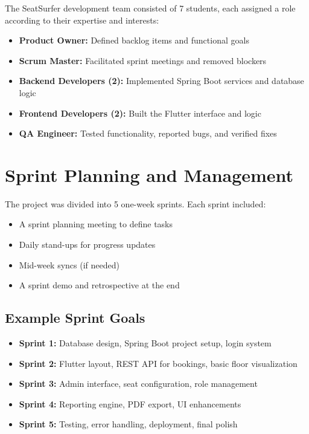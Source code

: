 \documentclass[12pt,a4paper]{report}
\begin{document}
The SeatSurfer development team consisted of 7 students, each assigned a role according to their expertise and interests:

\begin{itemize}
    \item \textbf{Product Owner:} Defined backlog items and functional goals
    \item \textbf{Scrum Master:} Facilitated sprint meetings and removed blockers
    \item \textbf{Backend Developers (2):} Implemented Spring Boot services and database logic
    \item \textbf{Frontend Developers (2):} Built the Flutter interface and logic
    \item \textbf{QA Engineer:} Tested functionality, reported bugs, and verified fixes
\end{itemize}

\section{Sprint Planning and Management}

The project was divided into 5 one-week sprints. Each sprint included:

\begin{itemize}
    \item A sprint planning meeting to define tasks
    \item Daily stand-ups for progress updates
    \item Mid-week syncs (if needed)
    \item A sprint demo and retrospective at the end
\end{itemize}

\subsection*{Example Sprint Goals}

\begin{itemize}
    \item \textbf{Sprint 1:} Database design, Spring Boot project setup, login system
    \item \textbf{Sprint 2:} Flutter layout, REST API for bookings, basic floor visualization
    \item \textbf{Sprint 3:} Admin interface, seat configuration, role management
    \item \textbf{Sprint 4:} Reporting engine, PDF export, UI enhancements
    \item \textbf{Sprint 5:} Testing, error handling, deployment, final polish
\end{itemize}
\end{document}
